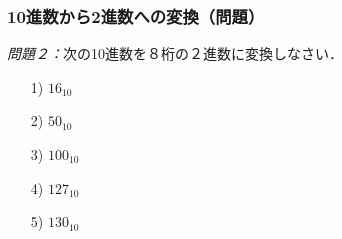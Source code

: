 \documentclass{beamer}                 %
\begin{document}
\begin{frame}
  \frametitle{10進数から2進数への変換（問題）}

\emph{問題２：}次の10進数を８桁の２進数に変換しなさい．
\begin{enumerate}
\item[1)] $16_{10}$
\vfill
\item[2)] $50_{10}$
\vfill
\item[3)] $100_{10}$
\vfill
\item[4)] $127_{10}$
\vfill
\item[5)] $130_{10}$
\vfill
\end{enumerate}
\end{frame}

\end{document}
